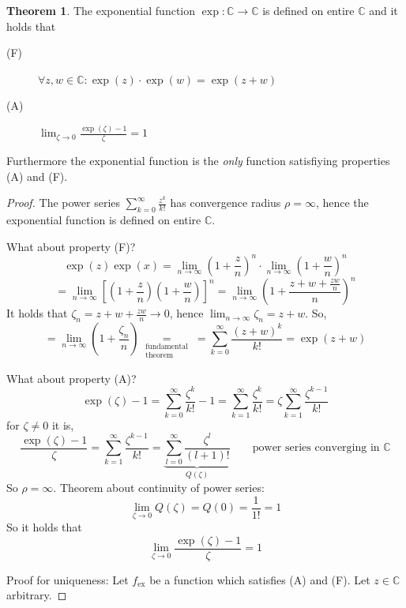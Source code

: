 \documentclass[a4paper,landscape,twocolumn]{article}
\theoremstyle{definition}
\newtheorem{theorem}{Theorem}
\begin{document}
\begin{theorem}
  The exponential function $\operatorname{exp}: \mathbb C \to \mathbb C$
  is defined on entire $\mathbb C$ and it holds that
  \begin{description}
    \item[(F)] $\forall z, w \in \mathbb C: \operatorname{exp}(z) \cdot \operatorname{exp}(w) = \operatorname{exp}(z + w)$
    \item[(A)] $\lim_{\zeta\to0} \frac{\operatorname{exp}(\zeta) - 1}{\zeta} = 1$
  \end{description}
  Furthermore the exponential function is the \emph{only} function satisfiying
  properties (A) and (F).
\end{theorem}
\begin{proof}
  The power series $\sum_{k=0}^\infty \frac{z^k}{k!}$ has convergence radius $\rho = \infty$,
  hence the exponential function is defined on entire $\mathbb C$.

  What about property (F)?
  \[
    \operatorname{exp}(z) \operatorname{exp}(x)
    = \lim_{n\to\infty} \left(1 + \frac zn\right)^n \cdot \lim_{n\to\infty} \left(1 + \frac wn\right)^n
  \] \[
    = \lim_{n\to\infty} \left[\left(1 + \frac zn\right) \left(1 + \frac wn\right)\right]^n
    = \lim_{n\to\infty} \left(1 + \frac{z + w + \frac {zw}{n}}{n}\right)^n
  \]
  It holds that $\zeta_n = z + w + \frac{zw}{n} \to 0$, hence $\lim_{n\to\infty} \zeta_n = z + w$.
  So,
  \[
    = \lim_{n\to\infty} \left(1 + \frac{\zeta_n}{n}\right)
    \underset{\substack{\text{fundamental} \\ \text{theorem}}}{=} = \sum_{k=0}^\infty
    \frac{(z + w)^k}{k!} = \exp(z + w)
  \]

  What about property (A)?
  \[
    \exp(\zeta) - 1
    = \sum_{k=0}^\infty \frac{\zeta^k}{k!} - 1
    = \sum_{k=1}^\infty \frac{\zeta^k}{k!}
    = \zeta \sum_{k=1}^\infty \frac{\zeta^{k-1}}{k!}
  \]
  for $\zeta \neq 0$ it is,
  \[
    \frac{\exp(\zeta) - 1}{\zeta}
    = \sum_{k=1}^\infty \frac{\zeta^{k-1}}{k!}
    = \underbrace{\sum_{l=0}^\infty \frac{\zeta^l}{(l+1)!}}_{Q(\zeta)}
    \qquad \text{power series converging in $\mathbb C$}
  \]
  So $\rho = \infty$. Theorem about continuity of power series:
  \[ \lim_{\zeta \to 0} Q(\zeta) = Q(0) = \frac1{1!} = 1 \]
  So it holds that
  \[ \lim_{\zeta \to 0} \frac{\exp(\zeta) - 1}{\zeta} = 1 \]

  Proof for uniqueness:
  Let $f_{\text{ex}}$ be a function which satisfies (A) and (F).
  Let $z \in \mathbb C$ arbitrary.


\end{proof}
\end{document}
